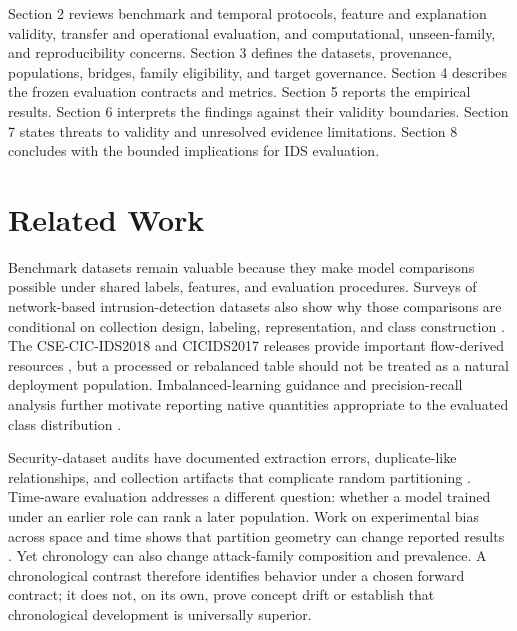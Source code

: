 \documentclass[preprint,12pt]{elsarticle}
\begin{document}
Section 2 reviews benchmark and temporal protocols, feature and explanation validity, transfer and operational evaluation, and computational, unseen-family, and reproducibility concerns. Section 3 defines the datasets, provenance, populations, bridges, family eligibility, and target governance. Section 4 describes the frozen evaluation contracts and metrics. Section 5 reports the empirical results. Section 6 interprets the findings against their validity boundaries. Section 7 states threats to validity and unresolved evidence limitations. Section 8 concludes with the bounded implications for IDS evaluation.

\section{Related Work}

Benchmark datasets remain valuable because they make model comparisons possible under shared labels, features, and evaluation procedures. Surveys of network-based intrusion-detection datasets also show why those comparisons are conditional on collection design, labeling, representation, and class construction \cite{ring2019survey}. The CSE-CIC-IDS2018 and CICIDS2017 releases provide important flow-derived resources \cite{sharafaldin2018toward,cse_cic_ids2018_official,cicids2017_official}, but a processed or rebalanced table should not be treated as a natural deployment population. Imbalanced-learning guidance and precision-recall analysis further motivate reporting native quantities appropriate to the evaluated class distribution \cite{he2009imbalanced,saito2015precision}.

Security-dataset audits have documented extraction errors, duplicate-like relationships, and collection artifacts that complicate random partitioning \cite{engelen2021troubleshooting,arp2022dos}. Time-aware evaluation addresses a different question: whether a model trained under an earlier role can rank a later population. Work on experimental bias across space and time shows that partition geometry can change reported results \cite{pendlebury2019tesseract}. Yet chronology can also change attack-family composition and prevalence. A chronological contrast therefore identifies behavior under a chosen forward contract; it does not, on its own, prove concept drift or establish that chronological development is universally superior.
\end{document}
